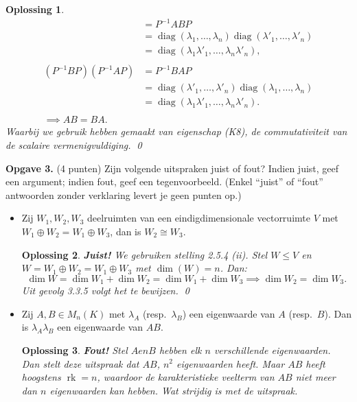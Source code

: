 \documentclass[a4paper,12pt]{article}
\newtheorem{oplossing}{Oplossing}
\begin{document}
\begin{enumerate}
\begin{itemize}
\begin{oplossing}
\begin{align*}
            &= P^{-1} AB P\\
            &=  \operatorname{diag}(\lambda_1,\dots,\lambda_n)  \operatorname{diag}(\lambda'_1,\dots,\lambda'_n)\\
            &= \operatorname{diag}(\lambda_1\lambda'_1,\dots,\lambda_n\lambda'_n),\\
            \\
            (P^{-1} B P)(P^{-1} A P)
            &= P^{-1} BA P\\
            &=  \operatorname{diag}(\lambda'_1,\dots,\lambda'_n)  \operatorname{diag}(\lambda_1,\dots,\lambda_n)\\
            &= \operatorname{diag}(\lambda_1\lambda'_1,\dots,\lambda_n\lambda'_n). \\
            \\
            \implies AB=BA.
        \end{align*}
        Waarbij we gebruik hebben gemaakt van eigenschap (K8), de commutativiteit van de scalaire vermenigvuldiging. \qed
    \end{oplossing}
\end{itemize}

\vspace{0.5cm}

\textbf{Opgave 3.} (4 punten) Zijn volgende uitspraken juist of fout? Indien juist, geef een argument; indien fout, geef een tegenvoorbeeld. (Enkel ``juist'' of ``fout'' antwoorden zonder verklaring levert je geen punten op.)
\begin{itemize}
    \item[(i)] Zij $W_1, W_2, W_3$ deelruimten van een eindigdimensionale vectorruimte $V$ met $W_1 \oplus W_2 = W_1 \oplus W_3$, dan is $W_2 \cong W_3$.
    \begin{oplossing}
        \textbf{Juist!}
        We gebruiken stelling 2.5.4 (ii). Stel \(W \le V\) en \(W = W_1 \oplus W_2 = W_1 \oplus W_3\) met \(\dim(W) = n\).
        Dan:
        \[
        \dim W = \dim W_1 + \dim W_2 = \dim W_1 + \dim W_3 \implies \dim W_2 = \dim W_3.
        \]
        Uit gevolg 3.3.5 volgt het te bewijzen. \qed
    \end{oplossing}
    \item[(ii)] Zij $A, B \in M_n(K)$ met $\lambda_A$ (resp.\ $\lambda_B$) een eigenwaarde van $A$ (resp.\ $B$). Dan is $\lambda_A \lambda_B$ een eigenwaarde van $AB$.
    \begin{oplossing}
        \textbf{Fout!} Stel \(A en B\) hebben elk \(n\) verschillende eigenwaarden. Dan stelt deze uitspraak dat \(AB\), \(n^2\) eigenwaarden heeft.
        Maar \(AB\) heeft hoogstens \(\operatorname{rk}=n\), waardoor de karakteristieke veelterm van \(AB\) niet meer dan \(n\) eigenwaarden kan hebben.
        Wat strijdig is met de uitspraak.


\end{oplossing}
\end{itemize}
\end{enumerate}
\end{document}
